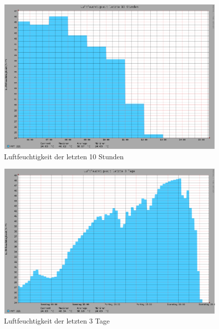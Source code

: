 \begin{figure}[!h] 
  \centering
     \includegraphics[scale=.3]{BilderAllgemein/Bilder/FeuchtigkeitTag.png}
  \caption{Luftfeuchtigkeit der letzten 10 Stunden}
\end{figure}

\begin{figure}[!h] 
  \centering
     \includegraphics[scale=.3]{BilderAllgemein/Bilder/Feuchtigkeit3Tage.png}
  \caption{Luftfeuchtigkeit der letzten 3 Tage}
\end{figure}